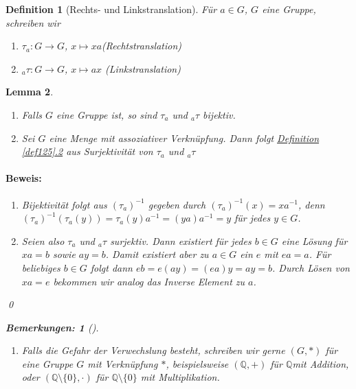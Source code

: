 \documentclass{report}
\newcommand{\IN}[1]{\index{#1|BH}}
\newcommand{\Q}{\mathbb{Q}}
\newcommand{\mQ}{\(\mathbb{Q}\)}
\theoremstyle{customrem}
\newtheorem*{bemerkung2}{Bemerkungen\textnormal:}
\newenvironment{bemerkungen}[1][]{\begin{bemerkung2}[#1]\leavevmode}{\end{bemerkung2}}
\theoremstyle{customdef}
\newtheorem{definition}{Definition}[chapter]
\newtheorem{lemma}[definition]{Lemma}
\renewenvironment{proof}{\paragraph{Beweis: }}{\qed}
\begin{document}
	\begin{definition}[Rechts- und Linkstranslation]
		\IN{Gruppe!Translation}
		Für \(a \in G\), \(G\) eine Gruppe, schreiben wir
		\begin{enumerate}[leftmargin=5cm, rightmargin=4cm]
			\item \(\tau_a : G \to G\), \(x \mapsto x a\)\hfill (Rechtstranslation)
			\item \(_{a}\tau : G \to G\), \(x \mapsto a x\) \hfill (Linkstranslation)
		\end{enumerate}
	\end{definition}
	
	\begin{lemma}\( \)\vspace{-.75cm}
		\label{lem128}
		\begin{enumerate}
			\item Falls \(G\) eine Gruppe ist, so sind \(\tau_a\) und \(_{a}\tau\) bijektiv.
			\item Sei \(G\) eine Menge mit assoziativer Verknüpfung. Dann folgt \hyperref[def125]{Definition \ref*{def125}.2} aus Surjektivität von \(\tau_a\) und \(_{a}\tau\)
		\end{enumerate}
		\vspace{.25cm}
		\begin{proof}
			\begin{enumerate}
				\item Bijektivität folgt aus  \((\tau_a)^{-1}\) gegeben durch \((\tau_a)^{-1}(x) = x a^{-1}\), denn \((\tau_a)^{-1}(\tau_a(y)) = \tau_a(y)a^{-1} = (y a) a^{-1} = y\) für jedes \(y \in G\).
				\item Seien also \(\tau_a\) und \(_{a}\tau\) surjektiv. Dann existiert für jedes \(b \in G\) eine Lösung für 
				\(x a = b\) sowie \(a y = b\). 
				Damit existiert aber zu \(a \in G\) ein  \(e\) mit \(ea = a\). Für beliebiges \(b \in G\) folgt dann \(e b = e (a y) = (e a) y = ay = b\).	Durch Lösen von \(x a = e\) bekommen wir analog das Inverse Element zu \(a\).
			\end{enumerate}
		\end{proof}
		\vspace{.25cm}
		\begin{bemerkungen}
			\begin{enumerate}
				\item Falls die Gefahr der Verwechslung besteht, schreiben wir gerne \((G, \ast)\) für eine Gruppe \(G\) mit Verknüpfung \(\ast\), 
				beispielsweise \((\Q, +)\) für \mQ mit Addition, oder \((\Q \setminus \{0\}, \cdot)\) für \(\Q \setminus \{0\}\) mit Multiplikation.

\end{enumerate}
\end{bemerkungen}
\end{lemma}
\end{document}
